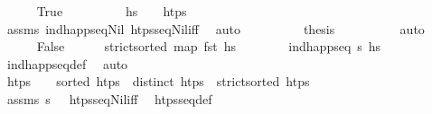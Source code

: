 \begin{isabellebody}
\ \ \ \ \isamarkupfalse%
\ True\isanewline
\ \ \ \ \ \ \isamarkupfalse%
\ \isamarkupfalse%
\ {\isachardoublequoteopen}hs\ {\isacharequal}{\kern0pt}\ {\isacharbrackleft}{\kern0pt}{\isacharbrackright}{\kern0pt}{\isachardoublequoteclose}\ \ {\isachardoublequoteopen}htps\ {\isacharequal}{\kern0pt}\ {\isacharbrackleft}{\kern0pt}{\isacharbrackright}{\kern0pt}{\isachardoublequoteclose}\isanewline
\ \ \ \ \ \ \ \ \isamarkupfalse%
\ assms\ ind{\isacharunderscore}{\kern0pt}happ{\isacharunderscore}{\kern0pt}seq{\isacharunderscore}{\kern0pt}Nil\ htps{\isacharunderscore}{\kern0pt}seq{\isacharunderscore}{\kern0pt}Nil{\isacharunderscore}{\kern0pt}iff\ \isamarkupfalse%
\ auto\isanewline
\ \ \ \ \ \ \isamarkupfalse%
\ \isamarkupfalse%
\ {\isacharquery}{\kern0pt}thesis\isanewline
\ \ \ \ \ \ \ \ \isamarkupfalse%
\ auto\isanewline
\ \ \isamarkupfalse%
\isanewline
\ \ \ \ \isamarkupfalse%
\ False\isanewline
\isanewline
\ \ \ \ \isamarkupfalse%
\ {\isachardoublequoteopen}strict{\isacharunderscore}{\kern0pt}sorted\ {\isacharparenleft}{\kern0pt}map\ fst\ hs{\isacharparenright}{\kern0pt}{\isachardoublequoteclose}\isanewline
\ \ \ \ \ \ \isamarkupfalse%
\ {\isacartoucheopen}ind{\isacharunderscore}{\kern0pt}happ{\isacharunderscore}{\kern0pt}seq\ {\isasympi}s\ hs{\isacartoucheclose}\ \isamarkupfalse%
\ ind{\isacharunderscore}{\kern0pt}happ{\isacharunderscore}{\kern0pt}seq{\isacharunderscore}{\kern0pt}def\ \isamarkupfalse%
\ auto\isanewline
\ \ \ \ \isamarkupfalse%
\ {\isachardoublequoteopen}htps\ {\isasymnoteq}\ {\isacharbrackleft}{\kern0pt}{\isacharbrackright}{\kern0pt}{\isachardoublequoteclose}\ \ {\isachardoublequoteopen}sorted\ htps{\isachardoublequoteclose}\ \ {\isachardoublequoteopen}distinct\ htps{\isachardoublequoteclose}\ \ {\isachardoublequoteopen}strict{\isacharunderscore}{\kern0pt}sorted\ htps{\isachardoublequoteclose}\isanewline
\ \ \ \ \ \ \isamarkupfalse%
\ assms\ {\isacartoucheopen}{\isasympi}s\ {\isasymnoteq}\ {\isacharbrackleft}{\kern0pt}{\isacharbrackright}{\kern0pt}{\isacartoucheclose}\ htps{\isacharunderscore}{\kern0pt}seq{\isacharunderscore}{\kern0pt}Nil{\isacharunderscore}{\kern0pt}iff\ \isamarkupfalse%
\ htps{\isacharunderscore}{\kern0pt}seq{\isacharunderscore}{\kern0pt}def\isanewline

\end{isabellebody}
